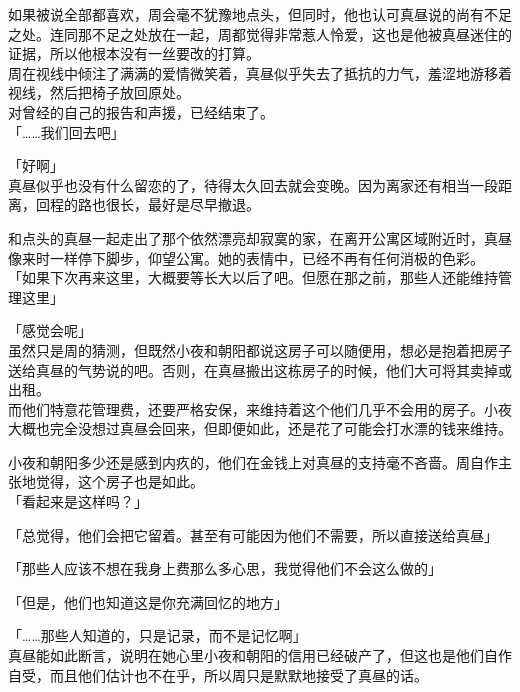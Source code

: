 如果被说全部都喜欢，周会毫不犹豫地点头，但同时，他也认可真昼说的尚有不足之处。连同那不足之处放在一起，周都觉得非常惹人怜爱，这也是他被真昼迷住的证据，所以他根本没有一丝要改的打算。\\

周在视线中倾注了满满的爱情微笑着，真昼似乎失去了抵抗的力气，羞涩地游移着视线，然后把椅子放回原处。\\

对曾经的自己的报告和声援，已经结束了。\\

「……我们回去吧」

「好啊」\\

真昼似乎也没有什么留恋的了，待得太久回去就会变晚。因为离家还有相当一段距离，回程的路也很长，最好是尽早撤退。

和点头的真昼一起走出了那个依然漂亮却寂寞的家，在离开公寓区域附近时，真昼像来时一样停下脚步，仰望公寓。她的表情中，已经不再有任何消极的色彩。\\

「如果下次再来这里，大概要等长大以后了吧。但愿在那之前，那些人还能维持管理这里」

「感觉会呢」\\

虽然只是周的猜测，但既然小夜和朝阳都说这房子可以随便用，想必是抱着把房子送给真昼的气势说的吧。否则，在真昼搬出这栋房子的时候，他们大可将其卖掉或出租。\\

而他们特意花管理费，还要严格安保，来维持着这个他们几乎不会用的房子。小夜大概也完全没想过真昼会回来，但即便如此，还是花了可能会打水漂的钱来维持。

小夜和朝阳多少还是感到内疚的，他们在金钱上对真昼的支持毫不吝啬。周自作主张地觉得，这个房子也是如此。\\

「看起来是这样吗？」

「总觉得，他们会把它留着。甚至有可能因为他们不需要，所以直接送给真昼」

「那些人应该不想在我身上费那么多心思，我觉得他们不会这么做的」

「但是，他们也知道这是你充满回忆的地方」

「……那些人知道的，只是记录，而不是记忆啊」\\

真昼能如此断言，说明在她心里小夜和朝阳的信用已经破产了，但这也是他们自作自受，而且他们估计也不在乎，所以周只是默默地接受了真昼的话。\\

